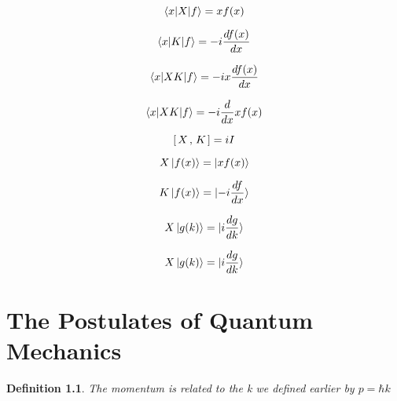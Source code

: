 \documentclass{tufte-book}
\newtheorem{definition}{Definition}
\newcommand{\commutator}[3][1.2em]{[ \makebox[#1]{$#2$} , \makebox[#1]{$#3$} ]}
\begin{document}
\begin{equation}
	\label{eq:20}
	\braket{x|X|f} = xf(x)
\end{equation}

\begin{equation}
	\label{eq:21}
	\braket{x|K|f} = -i\frac{df(x)}{dx}
\end{equation}

\begin{equation}
	\label{eq:22}
	\braket{x|XK|f} = -ix\frac{df(x)}{dx}
\end{equation}

\begin{equation}
	\label{eq:23}
	\braket{x|XK|f} = -i\frac{d}{dx}xf(x)
\end{equation}

\begin{equation}
	\label{eq:24}
	\commutator{X}{K} = iI
\end{equation}

\begin{equation}
	\label{eq:25}
	X\ket{f(x)} = \ket{xf(x)}
\end{equation}

\begin{equation}
	\label{eq:26}
	K\ket{f(x)} = \ket{-i\frac{df}{dx}}
\end{equation}

\begin{equation}
	\label{eq:27}
	X\ket{g(k)} = \ket{i\frac{dg}{dk}}
\end{equation}

\begin{equation}
	\label{eq:28}
	X\ket{g(k)} = \ket{i\frac{dg}{dk}}
\end{equation}

\chapter{The Postulates of Quantum Mechanics}
\begin{definition}
  \label{def:16}
	The momentum is related to the k we defined earlier by $p = \hbar k$
\end{definition}
\end{document}
